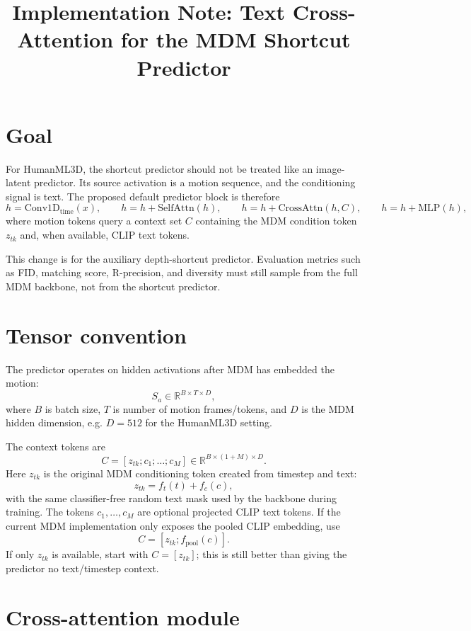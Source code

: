 \documentclass[11pt]{article}
\title{Implementation Note: Text Cross-Attention for the MDM Shortcut Predictor}
\author{}
\date{}
\begin{document}
\maketitle

\section{Goal}

For HumanML3D, the shortcut predictor should not be treated like an
image-latent predictor. Its source activation is a motion sequence, and the
conditioning signal is text. The proposed default predictor block is therefore
\[
  h = \mathrm{Conv1D}_{\mathrm{time}}(x),\qquad
  h = h + \mathrm{SelfAttn}(h),\qquad
  h = h + \mathrm{CrossAttn}(h, C),\qquad
  h = h + \mathrm{MLP}(h),
\]
where motion tokens query a context set $C$ containing the MDM condition token
$z_{tk}$ and, when available, CLIP text tokens.

This change is for the auxiliary depth-shortcut predictor. Evaluation metrics
such as FID, matching score, R-precision, and diversity must still sample from
the full MDM backbone, not from the shortcut predictor.

\section{Tensor convention}

The predictor operates on hidden activations after MDM has embedded the motion:
\[
  S_a \in \mathbb{R}^{B\times T\times D},
\]
where $B$ is batch size, $T$ is number of motion frames/tokens, and $D$ is the
MDM hidden dimension, e.g. $D=512$ for the HumanML3D setting.

The context tokens are
\[
  C = [z_{tk}; c_1;\ldots;c_M]\in \mathbb{R}^{B\times (1+M)\times D}.
\]
Here $z_{tk}$ is the original MDM conditioning token created from timestep and
text:
\[
  z_{tk}=f_t(t)+f_c(c),
\]
with the same classifier-free random text mask used by the backbone during
training. The tokens $c_1,\ldots,c_M$ are optional projected CLIP text tokens.
If the current MDM implementation only exposes the pooled CLIP embedding, use
\[
  C = [z_{tk}; f_{\mathrm{pool}}(c)].
\]
If only $z_{tk}$ is available, start with $C=[z_{tk}]$; this is still better
than giving the predictor no text/timestep context.

\section{Cross-attention module}
\end{document}

